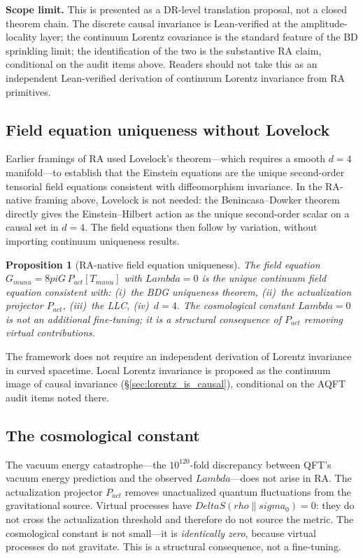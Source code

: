 \documentclass[11pt]{article}
\def\Delta{Delta}%
\def\Lambda{Lambda}%
\def\rho{rho}%
\def\sigma{sigma}%
\def\mu{mu}%
\def\nu{nu}%
\def\pi{pi}%
\def\mathrm#1{#1}%
\newtheorem{proposition}{Proposition}
\begin{document}
\textbf{Scope limit.} This is presented as a DR-level translation proposal, not a closed theorem chain. The discrete causal invariance is Lean-verified at the amplitude-locality layer; the continuum Lorentz covariance is the standard feature of the BD sprinkling limit; the identification of the two is the substantive RA claim, conditional on the audit items above. Readers should not take this as an independent Lean-verified derivation of continuum Lorentz invariance from RA primitives.

\subsection{Field equation uniqueness without Lovelock}
\label{sec:uniqueness}

Earlier framings of RA used Lovelock's theorem---which requires a smooth $d=4$ manifold---to establish that the Einstein equations are the unique second-order tensorial field equations consistent with diffeomorphism invariance. In the RA-native framing above, Lovelock is not needed: the Benincasa--Dowker theorem directly gives the Einstein--Hilbert action as the unique second-order scalar on a causal set in $d=4$. The field equations then follow by variation, without importing continuum uniqueness results.

\begin{proposition}[RA-native field equation uniqueness]
\label{prop:unique_field_eq}
The field equation $G_{\mu\nu} = 8\pi G\, P_{\mathrm{act}}[T_{\mu\nu}]$ with $\Lambda = 0$ is the unique continuum field equation consistent with: (i)~the BDG uniqueness theorem, (ii)~the actualization projector $P_{\mathrm{act}}$, (iii)~the LLC, (iv)~$d=4$. The cosmological constant $\Lambda = 0$ is not an additional fine-tuning; it is a structural consequence of $P_{\mathrm{act}}$ removing virtual contributions.
\end{proposition}

The framework does not require an independent derivation of Lorentz invariance in curved spacetime. Local Lorentz invariance is proposed as the continuum image of causal invariance (\S\ref{sec:lorentz_is_causal}), conditional on the AQFT audit items noted there.

\subsection{The cosmological constant}
\label{sec:lambda_zero}

The vacuum energy catastrophe---the $10^{120}$-fold discrepancy between QFT's vacuum energy prediction and the observed $\Lambda$---does not arise in RA. The actualization projector $P_{\mathrm{act}}$ removes unactualized quantum fluctuations from the gravitational source. Virtual processes have $\Delta S(\rho\|\sigma_0)=0$: they do not cross the actualization threshold and therefore do not source the metric. The cosmological constant is not small---it is \emph{identically zero}, because virtual processes do not gravitate. This is a structural consequence, not a fine-tuning.
\end{document}
